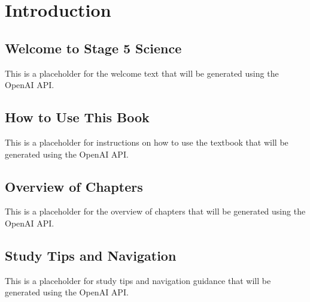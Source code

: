 \chapter{Introduction}


\section{Welcome to Stage 5 Science}

This is a placeholder for the welcome text that will be generated using the OpenAI API.

\section{How to Use This Book}

This is a placeholder for instructions on how to use the textbook that will be generated using the OpenAI API.

\section{Overview of Chapters}

This is a placeholder for the overview of chapters that will be generated using the OpenAI API.

\section{Study Tips and Navigation}

This is a placeholder for study tips and navigation guidance that will be generated using the OpenAI API.